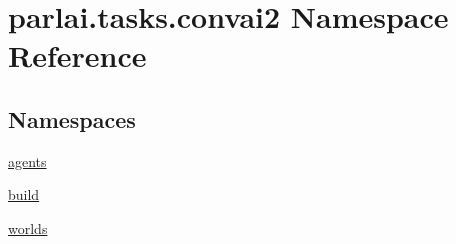 \hypertarget{namespaceparlai_1_1tasks_1_1convai2}{}\section{parlai.\+tasks.\+convai2 Namespace Reference}
\label{namespaceparlai_1_1tasks_1_1convai2}
\subsection*{Namespaces}
\begin{DoxyCompactItemize}
\item 
 \hyperlink{namespaceparlai_1_1tasks_1_1convai2_1_1agents}{agents}
\item 
 \hyperlink{namespaceparlai_1_1tasks_1_1convai2_1_1build}{build}
\item 
 \hyperlink{namespaceparlai_1_1tasks_1_1convai2_1_1worlds}{worlds}
\end{DoxyCompactItemize}
